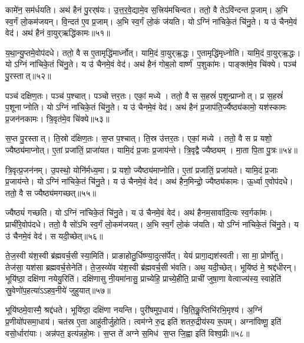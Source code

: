    कामे॑न॒ सम॑र्धयति।
   अथ॑ हैनं पु॒रर्{‌}ष॑यः।
   उ॒त्त॒र॒वे॒द्यामे॒व स॒त्त्रिय॑मचिन्वत।
   ततो॒ वै तेऽवि॑न्दन्त प्र॒जाम्।
   अ॒भि स्व॒र्गं लो॒कम॑जयन्।
   वि॒न्दत॑ ए॒व प्र॒जाम्।
   अ॒भि स्व॒र्गं लो॒कं ज॑यति।
   योऽग्निं ना॑चिके॒तं चि॑नु॒ते।
   य उ॑ चैनमे॒वं वेद॑।
   अथ॑ हैनं वा॒युर्{‌}ऋद्धि॑कामः॥५१॥

   य॒था॒न्यु॒प्तमे॒वोप॑दधे।
   ततो॒ वै स ए॒तामृद्धि॑मार्ध्नोत्।
   यामि॒दं वा॒युर्{‌}ऋ॒द्धः।
   ए॒तामृद्धि॑मृध्नोति।
   यामि॒दं वा॒युर्{‌}ऋ॒द्धः।
   योऽग्निं ना॑चिके॒तं चि॑नु॒ते।
   य उ॑ चैनमे॒वं वेद॑।
   अथ॑ हैनं गोब॒लो वार्ष्ण॑ प॒शुका॑मः।
   पाङ्क्त॑मे॒व चि॑क्ये।
   पञ्च॑ पु॒रस्तात्॥५२॥

   पञ्च॑ दक्षिण॒तः।
   पञ्च॑ प॒श्चात्।
   पञ्चोत्तर॒तः।
   एकां॒ मध्ये।
   ततो॒ वै स स॒हस्रं॑ प॒शून्प्राप्नोत्।
   प्र स॒हस्रं॑ प॒शूनाप्नोति।
   योऽग्निं ना॑चिके॒तं चि॑नु॒ते।
   य उ॑ चैनमे॒वं वेद॑।
   अथ॑ हैनं प्र॒जाप॑ति॒र्ज्यैष्ठ्य॑कामो॒ यश॑स्कामः प्र॒जन॑नकामः।
   त्रि॒वृत॑मे॒व चि॑क्ये॥५३॥

   स॒प्त पु॒रस्तात्।
   ति॒स्रो द॑क्षिण॒तः।
   स॒प्त प॒श्चात्।
   ति॒स्र उ॑त्तर॒तः।
   एकां॒ मध्ये।
   ततो॒ वै स प्र यशो॒ ज्यैष्ठ्य॑माप्नोत्।
   ए॒तां प्रजा॑तिं॒ प्राजा॑यत।
   यामि॒दं प्र॒जाः प्र॒जाय॑न्ते।
   त्रि॒वृद्वै ज्यैष्ठ्यम्।
   मा॒ता पि॒ता पु॒त्रः॥५४॥

   त्रि॒वृत्प्र॒जन॑नम्।
   उ॒पस्थो॒ योनि॑र्मध्य॒मा।
   प्र यशो॒ ज्यैष्ठ्य॑माप्नोति।
   ए॒तां प्रजा॑तिं॒ प्रजा॑यते।
   यामि॒दं प्र॒जाः प्र॒जाय॑न्ते।
   योऽग्निं ना॑चिके॒तं चि॑नु॒ते।
   य उ॑ चैनमे॒वं वेद॑।
   अथ॑ हैन॒मिन्द्रो॒ ज्यैष्ठ्य॑कामः।
   ऊ॒र्ध्वा ए॒वोप॑दधे।
   ततो॒ वै स ज्यैष्ठ्य॑मगच्छत्॥५५॥

   ज्यैष्ठ्यं॑ गच्छति।
   योऽग्निं ना॑चिके॒तं चि॑नु॒ते।
   य उ॑ चैनमे॒वं वेद॑।
   अथ॑ हैनम॒सावा॑दि॒त्यः स्व॒र्गका॑मः।
   प्राची॑रे॒वोप॑दधे।
   ततो॒ वै सो॑ऽभि स्व॒र्गं लो॒कम॑जयत्।
   अ॒भि स्व॒र्गं लो॒कं ज॑यति।
   योऽग्निं ना॑चिके॒तं चि॑नु॒ते।
   य उ॑ चैनमे॒वं वेद॑।
   स यदी॒च्छेत्॥५६॥

   ते॒ज॒स्वी य॑श॒स्वी ब्र॑ह्मवर्च॒सी स्या॒मिति॑।
   प्राङाहोतु॒र्धिष्ण्या॒\-दुत्स॑र्पेत्।
   येयं प्रागा॒द्यश॑स्वती।
   सा मा॒ प्रोर्णो॑तु।
   तेज॑सा॒ यश॑सा ब्रह्मवर्च॒सेनेति॑।
   ते॒ज॒स्व्ये॑व य॑श॒स्वी ब्र॑ह्मवर्च॒सी भ॑वति।
   अथ॒ यदी॒च्छेत्।
   भूयि॑ष्ठं मे॒ श्रद्द॑धीरन्।
   भूयि॑ष्ठा॒ दक्षि॑णा नयेयु॒रिति॑।
   दक्षि॑णासु नी॒यमा॑नासु॒ प्राच्येहि॒ प्राच्ये॒हीति॒ प्राची॑ जुषा॒णा वेत्वाज्य॑स्य॒ स्वाहेति॑ स्रु॒वेणो॑प॒हत्या॑ऽऽहव॒नीये॑ जुहुयात्॥५७॥

   भूयि॑ष्ठमे॒वास्मै॒ श्रद्द॑धते।
   भूयि॑ष्ठा॒ दक्षि॑णा नयन्ति।
   पुरी॑षमुप॒धाय॑।
   चि॒ति॒कॢ॒प्तिभि॑रभि॒मृश्य॑।
   अ॒ग्निं प्र॒णीयो॑प\-समा॒धाय॑।
   चत॑स्र ए॒ता आहु॑तीर्जुहोति।
   त्वम॑ग्ने रु॒द्र इति॑ शतरु॒द्रीय॑स्य रू॒पम्।
   अग्ना॑विष्णू॒ इति॑ वसो॒र्धारा॑याः।
   अन्न॑पत॒ इत्य॑न्नहो॒मः।
   स॒प्त ते॑ अग्ने स॒मिध॑ स॒प्त जि॒ह्वा इति॑ विश्व॒प्रीः॥५८॥
\anuvakamend
  
